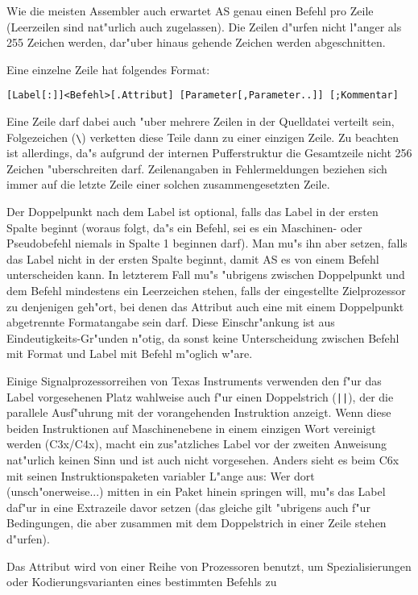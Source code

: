 \documentclass[12pt,a4paper,twoside]{report}
\begin{document}
Wie die meisten Assembler auch erwartet AS genau einen Befehl pro Zeile
(Leerzeilen sind nat"urlich auch zugelassen).  Die Zeilen d"urfen nicht
l"anger als 255 Zeichen werden, dar"uber hinaus gehende Zeichen werden
abgeschnitten.
\par
Eine einzelne Zeile hat folgendes Format:
\begin{verbatim}
[Label[:]]<Befehl>[.Attribut] [Parameter[,Parameter..]] [;Kommentar]
\end{verbatim}
Eine Zeile darf dabei auch "uber mehrere Zeilen in der Quelldatei
verteilt sein, Folgezeichen (\verb!\!) verketten diese Teile dann zu
einer einzigen Zeile.  Zu beachten ist allerdings, da"s aufgrund der
internen Pufferstruktur die Gesamtzeile nicht 256 Zeichen "uberschreiten
darf.  Zeilenangaben in Fehlermeldungen beziehen sich immer auf die
letzte Zeile einer solchen zusammengesetzten Zeile.
\par
Der Doppelpunkt nach dem Label ist optional, falls das Label in der
ersten Spalte beginnt (woraus folgt, da"s ein Befehl, sei es ein
Maschinen- oder Pseudobefehl niemals in Spalte 1 beginnen darf).
Man mu"s ihn aber setzen, falls das Label nicht in der ersten Spalte
beginnt, damit AS es von einem Befehl unterscheiden kann.  In letzterem
Fall mu"s "ubrigens zwischen Doppelpunkt und dem Befehl mindestens ein
Leerzeichen stehen, falls der eingestellte Zielprozessor zu denjenigen
geh"ort, bei denen das Attribut auch eine mit einem Doppelpunkt
abgetrennte Formatangabe sein darf.  Diese Einschr"ankung ist aus
Eindeutigkeits-Gr"unden n"otig, da sonst keine Unterscheidung zwischen
Befehl mit Format und Label mit Befehl m"oglich w"are.
\par
Einige Signalprozessorreihen von Texas Instruments verwenden den f"ur das
Label vorgesehenen Platz wahlweise auch f"ur einen Doppelstrich
(\verb!||!), der die parallele Ausf"uhrung mit der vorangehenden
Instruktion anzeigt.  Wenn diese beiden Instruktionen auf Maschinenebene
in einem einzigen Wort vereinigt werden (C3x/C4x), macht ein zus"atzliches
Label vor der zweiten Anweisung nat"urlich keinen Sinn und ist auch nicht
vorgesehen.  Anders sieht es beim C6x mit seinen Instruktionspaketen
variabler L"ange aus: Wer dort (unsch"onerweise...) mitten in ein Paket
hinein springen will, mu"s das Label daf"ur in eine Extrazeile davor setzen
(das gleiche gilt "ubrigens auch f"ur Bedingungen, die aber zusammen mit
dem Doppelstrich in einer Zeile stehen d"urfen).
\par
Das Attribut wird von einer Reihe von Prozessoren benutzt, um
Spezialisierungen oder Kodierungsvarianten eines bestimmten Befehls zu
\end{document}
